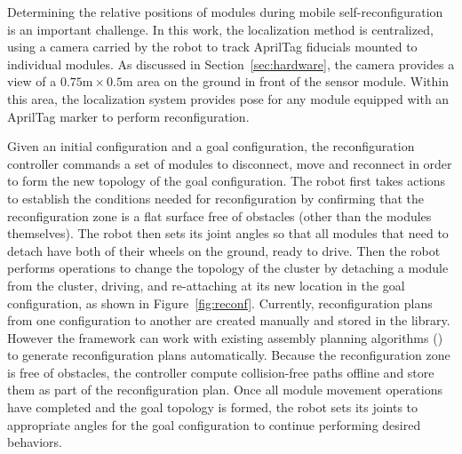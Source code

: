 \documentclass[12pt]{article}
\newcommand{\TODO}[1]{ {\bf \textcolor{red}{TODO:} #1 }}
\begin{document}
Determining the relative positions of modules during mobile self-reconfiguration is an important challenge. 
In this work, the localization method is centralized, using a camera carried by the robot to track AprilTag fiducials mounted to individual modules.
As discussed in Section~\ref{sec:hardware}, the camera provides a view of a $0.75\text{m}\times0.5\text{m}$ area on the ground in front of the sensor module.  
Within this area, the localization system provides pose for any module equipped with an AprilTag marker to perform reconfiguration. 

Given an initial configuration and a goal configuration, the reconfiguration controller commands a set of modules to disconnect, move and reconnect in order to form the new topology of the goal configuration. 
The robot first takes actions to establish the conditions needed for reconfiguration by confirming that the reconfiguration zone is a flat surface free of obstacles (other than the modules themselves).
The robot then sets its joint angles so that all modules that need to detach have both of their wheels on the ground, ready to drive.
Then the robot performs operations to change the topology of the cluster by detaching a module from the cluster, driving, and re-attaching at its new location in the goal configuration, as shown in Figure~\ref{fig:reconf}.
Currently, reconfiguration plans from one configuration to another are created manually and stored in the library. However the framework can work with existing assembly planning algorithms (\cite{Werfel2007,Seo2013}) to generate reconfiguration plans automatically.
Because the reconfiguration zone is free of obstacles, the controller compute collision-free paths offline and store them as part of the reconfiguration plan.
Once all module movement operations have completed and the goal topology is formed, the robot sets its joints to appropriate angles for the goal configuration to continue performing desired behaviors.
\end{document}
